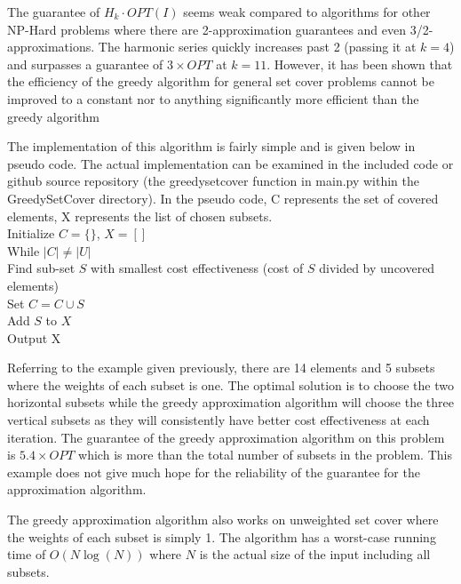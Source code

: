 \documentclass{report}
\begin{document}
The guarantee of $H_k\cdot OPT(I)$ seems weak compared to algorithms for other NP-Hard problems where there are 2-approximation guarantees and even 3/2-approximations. The harmonic series quickly increases past 2 (passing it at $k=4$) and surpasses a guarantee of $3\times OPT$ at $k=11$. However, it has been shown that the efficiency of the greedy algorithm for general set cover problems cannot be improved to a constant nor to anything significantly more efficient than the greedy algorithm %

The implementation of this algorithm is fairly simple and is given below in pseudo code. The actual implementation can be examined in the included code or github source repository (the greedy\textunderscore set\textunderscore cover function in main.py within the GreedySetCover directory). In the pseudo code, C represents the set of covered elements, X represents the list of chosen subsets.\\
Initialize $C=\{\}$, $X=[]$\\
While $|C| \neq |U|$\\
Find sub-set $S$ with smallest cost effectiveness (cost of $S$ divided by uncovered elements)\\
Set $C=C \cup S$\\
Add $S$ to $X$\\
Output X

Referring to the example given previously, there are 14 elements and 5 subsets where the weights of each subset is one. The optimal solution is to choose the two horizontal subsets while the greedy approximation algorithm will choose the three vertical subsets as they will consistently have better cost effectiveness at each iteration. The guarantee of the greedy approximation algorithm on this problem is $5.4\times OPT$ which is more than the total number of subsets in the problem. This example does not give much hope for the reliability of the guarantee for the approximation algorithm. 

The greedy approximation algorithm also works on unweighted set cover where the weights of each subset is simply 1. The algorithm has a worst-case running time of $O(N\log(N))$ where $N$ is the actual size of the input including all subsets.
\end{document}
